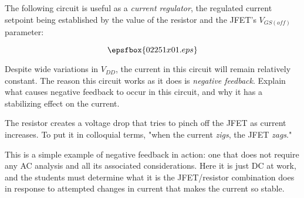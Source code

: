 

The following circuit is useful as a {\it current regulator}, the regulated current setpoint being established by the value of the resistor and the JFET's $V_{GS(off)}$ parameter:

$$\epsfbox{02251x01.eps}$$

Despite wide variations in $V_{DD}$, the current in this circuit will remain relatively constant.  The reason this circuit works as it does is {\it negative feedback}.  Explain what causes negative feedback to occur in this circuit, and why it has a stabilizing effect on the current.







The resistor creates a voltage drop that tries to pinch off the JFET as current increases.  To put it in colloquial terms, "when the current {\it zigs}, the JFET {\it zags}."







This is a simple example of negative feedback in action: one that does not require any AC analysis and all its associated considerations.  Here it is just DC at work, and the students must determine what it is the JFET/resistor combination does in response to attempted changes in current that makes the current so stable.




